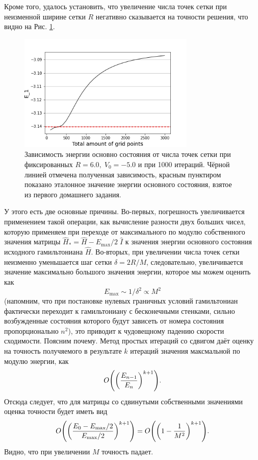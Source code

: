 \documentclass[10pt]{article}
\begin{document}
Кроме того, удалось установить, что увеличение числа точек сетки при неизменной ширине сетки $R$ негативно сказывается на точности решения, что видно на Рис. \ref{fig:e1_vs_m}.
\begin{figure}[htbp]
 \centering
 \includegraphics[width=0.75\textwidth]{../figures/e1_vs_m}
 \caption{Зависимость энергии основно состояния от числа точек сетки при фиксированных $R=6.0,\; V_0 = -5.0$ и при 1000 итераций. Чёрной линией отмечена полученная зависимость, красным пунктиром показано эталонное значение энергии основного состояния, взятое из первого домашнего задания.}
 \label{fig:e1_vs_m}
\end{figure}
У этого есть две основные причины. Во-первых, погрешность увеличивается применением такой операции, как вычисление разности двух больших чисел, которую применяем при переходе от максимального по модулю собственного значения матрицы $\hat H_* = \hat H - E_\textrm{max}/2\; \hat I$ к значения энергии основного состояния исходного гамильтониана $\hat H$. Во-вторых, при увеличении числа точек сетки неизменно уменьшается шаг сетки $\delta = 2R/M$, следовательно, увеличивается значение максимально большого значения энергии, которое мы можем оценить как $$E_\textrm{max} \sim 1/\delta^2\propto M^2$$ (напомним, что при постановке нулевых граничных условий гамильтониан фактически переходит к гамильтониану с бесконечными стенками, сильно возбужденные состояния которого будут зависеть от номера состояния пропорционально $n^2$), это приводит к чудовещному падению скорости сходимости. Поясним почему. Метод простых итераций со сдвигом  даёт оценку на точность получяемого в результате $k$ итераций значения максмальной по модулю энергии, как
\begin{equation}
 O\qty(\qty(\dfrac{E_{n-1}}{E_{n}})^{k+1}).
\end{equation}
Отсюда следует, что для матрицы со сдвинутыми собственными значениями оценка точности будет иметь вид
\begin{equation}
 O \qty( \qty(\dfrac{E_0 - E_\textrm{max}/2}{E_\textrm{max}/2})^{k+1} ) = O \qty( \qty(1-\dfrac{1}{M^2})^{k+1} ).
\end{equation}
Видно, что при увеличении $M$ точность падает.
\end{document}
